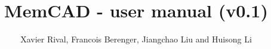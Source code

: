 \documentclass[a4paper,10pt]{book}
\begin{document}
\title{MemCAD - user manual (v0.1)}
\author{Xavier Rival, Francois Berenger, Jiangchao Liu and Huisong Li}
\maketitle
\tableofcontents
\multibegin
\raggedcolumns







\multiend



\end{document}
